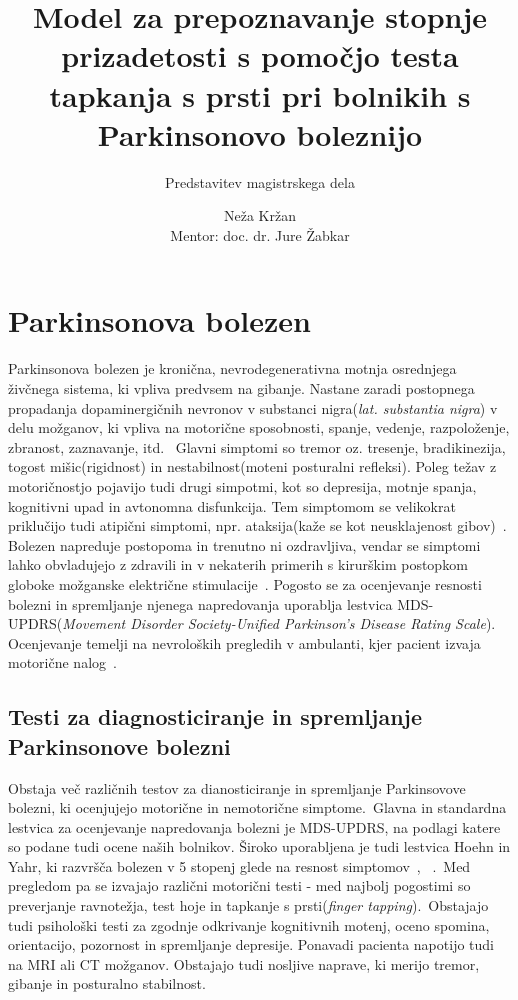 \documentclass[a4paper,12pt]{article}
\title{Model za prepoznavanje stopnje prizadetosti s pomočjo testa tapkanja s prsti pri bolnikih s Parkinsonovo boleznijo}
\subtitle{Predstavitev magistrskega dela}
\author{Neža Kržan \\
Mentor: doc. dr. Jure Žabkar}
\begin{document}
\maketitle

\section{Parkinsonova bolezen}

Parkinsonova bolezen je kronična, nevrodegenerativna motnja osrednjega živčnega sistema, ki vpliva 
predvsem na gibanje. Nastane zaradi postopnega propadanja dopaminergičnih nevronov v substanci 
nigra(\textit{lat. substantia nigra}) v delu možganov, ki vpliva na motorične sposobnosti, spanje, vedenje, 
razpoloženje, zbranost, zaznavanje, itd. \
Glavni simptomi so tremor oz. tresenje, bradikinezija, togost mišic(rigidnost) in nestabilnost(moteni posturalni refleksi). 
Poleg težav z motoričnostjo pojavijo tudi drugi simpotmi, kot so depresija, 
motnje spanja, kognitivni upad in avtonomna disfunkcija. Tem simptomom se velikokrat priklučijo tudi 
atipični simptomi, npr. ataksija(kaže se kot neusklajenost gibov)~\cite{NINDS}. \\

Bolezen napreduje postopoma in trenutno ni ozdravljiva, vendar se simptomi lahko obvladujejo z zdravili 
in v nekaterih primerih s kirurškim postopkom globoke možganske električne stimulacije~\cite{Sveinbjornsdottir}. 
Pogosto se za ocenjevanje resnosti bolezni in spremljanje njenega napredovanja uporablja lestvica 
MDS-UPDRS(\textit{Movement Disorder Society-Unified Parkinson's Disease Rating Scale}). Ocenjevanje temelji na 
nevroloških pregledih v ambulanti, kjer pacient izvaja motorične nalog~\cite{Goetz}. \\

\subsection{Testi za diagnosticiranje in spremljanje Parkinsonove bolezni}

Obstaja več različnih testov za dianosticiranje in spremljanje Parkinsovove bolezni, ki ocenjujejo 
motorične in nemotorične simptome.\
Glavna in standardna lestvica za ocenjevanje napredovanja bolezni je MDS-UPDRS, na podlagi katere so 
podane tudi ocene naših bolnikov. Široko uporabljena je tudi lestvica Hoehn in Yahr, ki razvršča 
bolezen v 5 stopenj glede na resnost simptomov~\cite{Bhidayasiri}, ~\cite{wiki}.\
Med pregledom pa se izvajajo različni motorični testi - med najbolj pogostimi so preverjanje ravnotežja, 
test hoje in tapkanje s prsti(\textit{finger tapping}).\
Obstajajo tudi psihološki testi za zgodnje odkrivanje kognitivnih motenj, oceno spomina, orientacijo, 
pozornost in spremljanje depresije. Ponavadi pacienta napotijo tudi na MRI ali CT možganov. Obstajajo 
tudi nosljive naprave, ki merijo tremor, gibanje in posturalno stabilnost.
\end{document}
